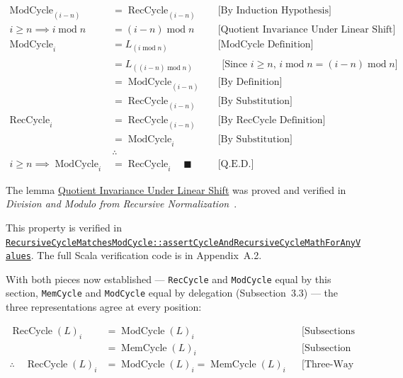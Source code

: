 \begin{equation*}
\begin{aligned}
\operatorname{ModCycle}_{(i-n)} &= \operatorname{RecCycle}_{(i-n)}
  && \text{[By Induction Hypothesis]} \\
i\geq n \implies i\operatorname{mod}n
  &= (i-n)\operatorname{mod}n
  && \text{[Quotient Invariance Under Linear Shift]} \\
\operatorname{ModCycle}_i &= L_{(i\operatorname{mod}n)}
  && \text{[ModCycle Definition]} \\
&=L_{((i-n)\operatorname{mod}n)}
  && \substack{\text{[Since }i\geq n\text{, }i\operatorname{mod}n
       =(i-n)\operatorname{mod}n\text{]}} \\
&=\operatorname{ModCycle}_{(i-n)} && \text{[By Definition]} \\
&=\operatorname{RecCycle}_{(i-n)} && \text{[By Substitution]} \\
\operatorname{RecCycle}_i &= \operatorname{RecCycle}_{(i-n)}
  && \text{[By RecCycle Definition]} \\
&=\operatorname{ModCycle}_i && \text{[By Substitution]} \\
&\therefore \\
i\geq n \implies \operatorname{ModCycle}_i &= \operatorname{RecCycle}_i
  \quad \blacksquare && \text{[Q.E.D.]}
\end{aligned}
\end{equation*}

The lemma
\href{https://github.com/thiagomata/prime-numbers/blob/cycle-article-v1.0.0/articles/chapter2/modulo.md#65-quotient-invariance-under-linear-shift}{Quotient Invariance Under Linear Shift}
was proved and verified in
\emph{Division and Modulo from Recursive Normalization}~\cite{mata2026modulo}.

{\raggedright
This property is verified in
\href{https://github.com/thiagomata/prime-numbers/blob/cycle-article-v1.0.0/src/main/scala/v1/chapter4/cycle/recursive/properties/RecursiveCycleMatchesModCycle.scala}{\texttt{RecursiveCycleMatchesModCycle::}\allowbreak\texttt{assertCycleAndRecursiveCycleMathForAnyValues}}.
The full Scala verification code is in Appendix~A.2.
\par}

With both pieces now established --- \texttt{RecCycle} and \texttt{ModCycle}
equal by this section, \texttt{MemCycle} and \texttt{ModCycle} equal by
delegation (Subsection~3.3) --- the three representations agree at every
position:

\begin{equation*}
\begin{aligned}
\operatorname{RecCycle}(L)_i
  &=\operatorname{ModCycle}(L)_i && \text{[Subsections 4.1--4.2]} \\
  &=\operatorname{MemCycle}(L)_i && \text{[Subsection 3.3]} \\
\therefore\quad \operatorname{RecCycle}(L)_i
  &=\operatorname{ModCycle}(L)_i=\operatorname{MemCycle}(L)_i
  && \text{[Three-Way Equality]}
\end{aligned}
\end{equation*}
